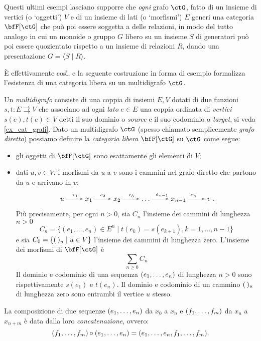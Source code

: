 Questi ultimi esempi lasciano supporre che \emph{ogni} grafo \(\ctG\), fatto di un insieme di vertici (o `oggetti') \(V\) e di un insieme di lati (o `morfismi') \(E\) generi una categoria \(\bfF[\ctG]\) che può poi essere soggetta a delle relazioni, in modo del tutto analogo in cui un monoide o gruppo \(G\) libero su un insieme \(S\) di generatori può poi essere quozientato rispetto a un insieme di relazioni \(R\), dando una presentazione \(G = \langle S\mid R\rangle\).

\`E effettivamente così, e la seguente costruzione in forma di esempio formalizza l'esistenza di una categoria libera su un multidigrafo \(\ctG\).
\begin{example}\label{ex_cat_libera}
	Un \emph{multidigrafo} consiste di una coppia di insiemi \(E,V\) dotati di due funzioni \(s,t : E\rightrightarrows V\) che associano ad ogni \emph{lato} \(e\in E\) una coppia ordinata di \emph{vertici} \(s(e),t(e)\in V\) detti il suo dominio o \emph{source} e il suo codominio o \emph{target}, si veda \ref{ex_cat_grafi}. Dato un multidigrafo \(\ctG\) (spesso chiamato semplicemente \emph{grafo diretto}) possiamo definire la \emph{categoria libera} \(\bfF[\ctG]\) su \(\ctG\) come segue:
	\begin{itemize}
		\item gli oggetti di \(\bfF[\ctG]\) sono esattamente gli elementi di \(V\);
		\item dati \(u,v\in V\), i morfismi da \(u\) a \(v\) sono i cammini nel grafo diretto che partono da \(u\) e arrivano in \(v\):
		      \[\xymatrix{u \ar[r]^{e_1}& x_1 \ar[r]^{e_2}& x_2\ar[r]^{e_3}& \dots\ar[r]^{e_{n-1}}& x_{n-1}\ar[r]^{e_n}& v}.\]
		      Più precisamente, per ogni \(n>0\), sia \(C_n\) l'insieme dei cammini di lunghezza \(n>0\)
		      \[C_n=\{(e_1,\ldots,e_n)\in E^n \mid t(e_k)=s(e_{k+1}), k=1,\ldots,n-1\}\]
		      e sia \(C_0=\{(\,)_u \mid u\in V\}\) l'insieme dei cammini di lunghezza zero.
		      L'insieme dei morfismi di \(\bfF[\ctG]\) è
		      \[\sum_{n\ge0}C_n\]
		      Il dominio e codominio di una sequenza \((\tup en,)\) di lunghezza \(n>0\) sono rispettivamente \(s(e_1)\) e \(t(e_n)\).
		      Il dominio e codominio di un cammino \((\,)_u\) di lunghezza zero sono entrambi il vertice \(u\) stesso.
	\end{itemize}
	La composizione di due sequenze \((\tup en,)\) da \(x_0\) a \(x_n\) e \((\tup fm,)\) da \(x_n\) a \(x_{n+m}\) è data dalla loro \emph{concatenazione}, ovvero:
	\[(\tup fm,)\cmp(\tup en,) = (\tup en, , \tup fm,).\]

\end{example}
